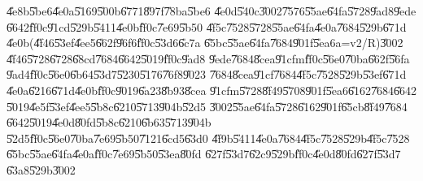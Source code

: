 \documentclass{article}
\begin{document}
\U{4e8b}\U{5be6}\U{4e0a}\U{5169}\U{500b}\U{6771}\U{897f}\U{78ba}\U{5be6}%
\U{4e0d}\U{540c}\U{3002}\U{7576}\U{55ae}\U{64fa}\U{5728}\U{9ad8}\U{9ede}%
\U{6642}\U{ff0c}\U{91cd}\U{529b}\U{5411}\U{4e0b}\U{ff0c}\U{7e69}\U{5b50}%
\U{4f5c}\U{7528}\U{5728}\U{55ae}\U{64fa}\U{4e0a}\U{7684}\U{529b}\U{671d}%
\U{4e0b}(\U{4f46}\U{53ef}\U{4ee5}\U{662f}\U{96f6}\U{ff0c}\U{53d6}\U{6c7a}%
\U{65bc}\U{55ae}\U{64fa}\U{7684}\U{901f}\U{5ea6}a=v2/R)\U{3002}%
\U{4f46}\U{5728}\U{6728}\U{68cd}\U{7684}\U{6642}\U{5019}\U{ff0c}\U{9ad8}%
\U{9ede}\U{7684}\U{8cea}\U{91cf}m\U{ff0c}\U{56e0}\U{70ba}\U{662f}\U{56fa}%
\U{9ad4}\U{ff0c}\U{56e0}\U{6b64}\U{53d7}\U{5230}\U{5176}\U{76f8}\U{9023}%
\U{7684}\U{8cea}\U{91cf}\U{7684}\U{4f5c}\U{7528}\U{529b}\U{53ef}\U{671d}%
\U{4e0a}\U{6216}\U{671d}\U{4e0b}\U{ff0c}\U{9019}\U{6a23}\U{8b93}\U{8cea}%
\U{91cf}m\U{5728}\U{8f49}\U{5708}\U{901f}\U{5ea6}\U{6162}\U{7684}\U{6642}%
\U{5019}\U{4e5f}\U{53ef}\U{4ee5}\U{5b8c}\U{6210}\U{5713}\U{904b}\U{52d5}%
\U{3002}\U{55ae}\U{64fa}\U{5728}\U{6162}\U{901f}\U{65cb}\U{8f49}\U{7684}%
\U{6642}\U{5019}\U{4e0d}\U{80fd}\U{5b8c}\U{6210}\U{6b63}\U{5713}\U{904b}%
\U{52d5}\U{ff0c}\U{56e0}\U{70ba}\U{7e69}\U{5b50}\U{7121}\U{6cd5}\U{63d0}%
\U{4f9b}\U{5411}\U{4e0a}\U{7684}\U{4f5c}\U{7528}\U{529b}\U{4f5c}\U{7528}%
\U{65bc}\U{55ae}\U{64fa}\U{4e0a}\U{ff0c}\U{7e69}\U{5b50}\U{53ea}\U{80fd}%
\U{627f}\U{53d7}\U{62c9}\U{529b}\U{ff0c}\U{4e0d}\U{80fd}\U{627f}\U{53d7}%
\U{63a8}\U{529b}\U{3002}
\end{document}
